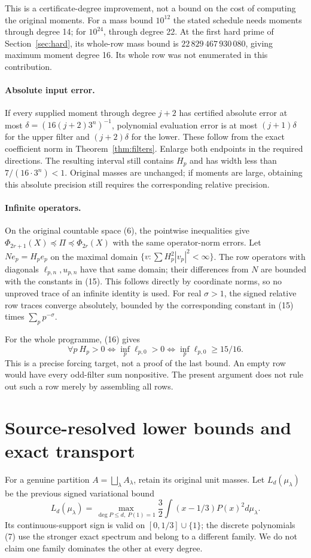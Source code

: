 This is a certificate-degree improvement, not a bound on the cost of computing
the original moments. For a mass bound $10^{12}$ the stated schedule needs
moments through degree 14; for $10^{24}$, through degree 22. At the first hard
prime of Section~\ref{sec:hard}, its whole-row mass bound is
$22\,829\,467\,930\,080$, giving maximum moment degree 16. Its whole row was
not enumerated in this contribution.

\paragraph{Absolute input error.}
If every supplied moment through degree $j+2$ has certified absolute error
at most $\delta=(16(j+2)3^n)^{-1}$, polynomial evaluation error is at most
$(j+1)\delta$ for the upper filter and $(j+2)\delta$ for the lower.
These follow from the exact coefficient norm in Theorem~\ref{thm:filters}.
Enlarge both endpoints in the required directions. The resulting interval
still contains $H_p$ and has width less than $7/(16\cdot3^n)<1$.
Original masses are unchanged; if moments are large, obtaining this absolute
precision still requires the corresponding relative precision.

\paragraph{Infinite operators.}
On the original countable space (6), the pointwise inequalities give
$\Phi_{2r+1}(X)\preceq\Pi\preceq\Phi_{2r}(X)$ with the same operator-norm errors.
Let $N e_p=H_pe_p$ on the maximal domain
$\{v:\sum H_p^2|v_p|^2<\infty\}$. The row operators with diagonals
$\ell_{p,n},u_{p,n}$ have that same domain; their differences from $N$ are
bounded with the constants in (15). This follows directly by coordinate norms,
so no unproved trace of an infinite identity is used. For real $\sigma>1$,
the signed relative row traces converge absolutely, bounded by the corresponding
constant in (15) times $\sum_p p^{-\sigma}$.

For the whole programme, (16) gives
\[
 \forall p\ H_p>0
 \iff\inf_p\ell_{p,0}>0
 \iff\inf_p\ell_{p,0}\ge15/16.
 \tag{17}
\]
This is a precise forcing target, not a proof of the last bound. An empty row
would have every odd-filter sum nonpositive. The present argument does not
rule out such a row merely by assembling all rows.

\section{Source-resolved lower bounds and exact transport}
For a genuine partition $A=\bigsqcup_\lambda A_\lambda$, retain its original
unit masses. Let $L_d(\mu_\lambda)$ be the previous signed variational bound
\[
 L_d(\mu_\lambda)=\max_{\deg P\le d,\ P(1)=1}
 \frac32\int(x-1/3)P(x)^2d\mu_\lambda.
 \tag{18}
\]
Its continuous-support sign is valid on $[0,1/3]\cup\{1\}$; the discrete
polynomials (7) use the stronger exact spectrum and belong to a different
family. We do not claim one family dominates the other at every degree.

